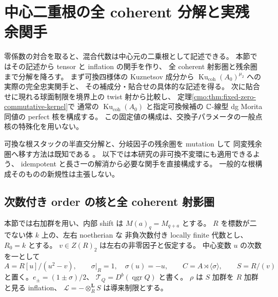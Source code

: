 \section{中心二重根の全 coherent 分解と実残余関手}
\label{mix:sec:root-order}

零係数の対合を取ると、混合代数は中心元の二乗根として記述できる。
本節ではその記述から tensor と inflation の関手を作り、
全 coherent 射影圏と残余圏まで分解を降ろす。
まず可換四様体の Kuznetsov 成分から
$\operatorname{Ku}_{\mathrm{coh}}(A_0)^{\mu_2}$ への実際の完全忠実関手と、
その補成分・貼合せの具体的な記述を得る。
次に貼合せに現れる球面制限を境界上の twist 射から比較し、
定理\ref{cmo:thm:fixed-zero-commutative-kernel}で
通常の $\operatorname{Ku}_{\mathrm{coh}}(A_0)$ と指定可換候補の
$\mathbb C$-線型 dg Morita 同値の perfect 核を構成する。
この固定値の構成は、交換子パラメータの一般点核の特殊化を用いない。

可換な根スタックの半直交分解と、分岐因子の残余圏を mutation して
同変残余圏へ移す方法は既知である
\cite[Sections~4 and~6]{CMOKuznetsovPerryCovers}。
以下では本研究の非可換不変環にも適用できるよう、
idempotent と長さ一の解消から必要な関手を直接構成する。
一般的な根構成そのものの新規性は主張しない。

\subsection{次数付き order の核と全 coherent 射影圏}

本節では右加群を用い、内部 shift は $M(a)_q=M_{q+a}$ とする。
$R$ を標数が二でない体 $k$ 上の、左右 noetherian な
非負次数付き locally finite 代数とし、$R_0=k$ とする。
$v\in Z(R)_2$ は左右の非零因子と仮定する。
中心変数 $u$ の次数を一として
\[
 A=R[u]/(u^2-v),\qquad
 \sigma|_R=1,\quad \sigma(u)=-u,\qquad
 C=A\rtimes\langle\sigma\rangle,\qquad S=R/(v)
\]
と置く。$e_\pm=(1\pm\sigma)/2$、
$\mathcal T_Q=D^b(\operatorname{qgr}Q)$ と書く。
$\rho$ は $S$ 加群を $R$ 加群と見る inflation、
$\mathcal L=-\otimes_R^{\mathbf L}S$ は導来制限とする。

